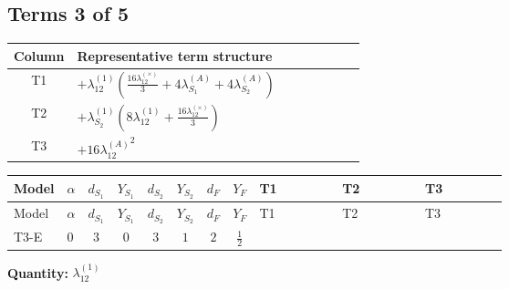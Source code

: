 \documentclass[8pt]{article}
\begin{document}
\begin{landscape}
\subsection*{Terms 3 of 5}
\begin{center}
\begin{tabular}{@{}c >{\raggedright\arraybackslash}p{0.82\linewidth}@{}}
\toprule
Column & Representative term structure \\
\midrule
T1 & \(\displaystyle +{\lambda_{12}^{(1)}} \left(\frac{16 {\lambda_{12}^{(\times)}}}{3}+4 {\lambda_{S_1}^{(A)}}+4 {\lambda_{S_2}^{(A)}}\right)\) \\
\midrule
T2 & \(\displaystyle +{\lambda_{S_2}^{(1)}} \left(8 {\lambda_{12}^{(1)}}+\frac{16 {\lambda_{12}^{(\times)}}}{3}\right)\) \\
\midrule
T3 & \(\displaystyle +16 {\lambda_{12}^{(A)}}^2\) \\
\midrule
\bottomrule
\end{tabular}
\end{center}
\smallskip
\tiny
\begin{longtable}{@{}llcccccc >{\raggedright\arraybackslash}p{0.21\linewidth} >{\raggedright\arraybackslash}p{0.21\linewidth} >{\raggedright\arraybackslash}p{0.21\linewidth}@{}}
\toprule
Model & $\alpha$ & $d_{S_1}$ & $Y_{S_1}$ & $d_{S_2}$ & $Y_{S_2}$ & $d_F$ & $Y_F$ & T1 & T2 & T3 \\
\midrule
\endfirsthead
\toprule
Model & $\alpha$ & $d_{S_1}$ & $Y_{S_1}$ & $d_{S_2}$ & $Y_{S_2}$ & $d_F$ & $Y_F$ & T1 & T2 & T3 \\
\midrule
\endhead
T3-E & $0$ & $3$ & $0$ & $3$ & $1$ & $2$ & $\frac{1}{2}$ & \scriptsize\adjustbox{max width=\linewidth}{$\begin{gathered} +{\lambda_{12}^{(1)}} \left(\frac{16 {\lambda_{12}^{(\times)}}}{3}+4 {\lambda_{S_1}^{(A)}}+4 {\lambda_{S_2}^{(A)}}\right)\end{gathered}$} & \scriptsize\adjustbox{max width=\linewidth}{$\begin{gathered} +{\lambda_{S_2}^{(1)}} \left(8 {\lambda_{12}^{(1)}}+\frac{16 {\lambda_{12}^{(\times)}}}{3}\right)\end{gathered}$} & \scriptsize\adjustbox{max width=\linewidth}{$\begin{gathered} +16 {\lambda_{12}^{(A)}}^2\end{gathered}$} \\
\midrule
\bottomrule
\end{longtable}
\clearpage
\noindent\textbf{Quantity: }$\lambda_{12}^{(1)}$\par\smallskip

\end{landscape}
\end{document}
